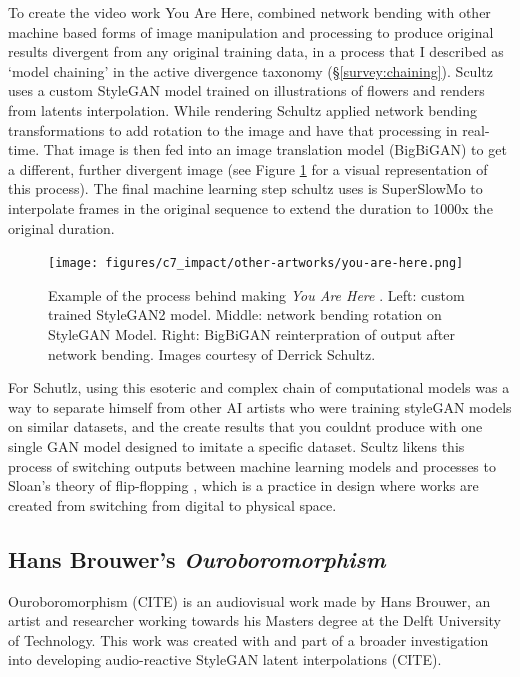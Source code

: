 To create the video work You Are Here, \citep{schutlz2020you} combined network bending with other machine based forms of image manipulation and processing to produce original results divergent from any original training data, in a process that I described as `model chaining' in the active divergence taxonomy (\S \ref{survey:chaining}).
Scultz uses a custom StyleGAN model trained on illustrations of flowers and renders from latents interpolation. 
While rendering Schultz applied network bending transformations to add rotation to the image and have that processing in real-time. 
That image is then fed into an image translation model (BigBiGAN) \citep{donahue2019large} to get a different, further divergent image (see Figure \ref{fig:c7:you-are-here} for a visual representation of this process). 
The final machine learning step schultz uses is SuperSlowMo \citep{jiang2018super} to interpolate frames in the original sequence to extend the duration to 1000x the original duration.

\begin{figure}[!htb]
    \centering
    \captionsetup{justification=centering}
    \texttt{[image: figures/c7\_impact/other-artworks/you-are-here.png]}
    \caption[Example of the process behind making \textit{You Are Here}.]{Example of the process behind making \textit{You Are Here} \citep{schutlz2020you}. Left: custom trained StyleGAN2 model. Middle: network bending rotation on StyleGAN Model. Right: BigBiGAN reinterpration of output after network bending. Images courtesy of Derrick Schultz.}
    \label{fig:c7:you-are-here}
\end{figure}

For Schutlz, using this esoteric and complex chain of computational models was a way to separate himself from other AI artists who were training styleGAN models on similar datasets, and the create results that you couldnt produce with one single GAN model designed to imitate a specific dataset. 
Scultz likens this process of switching outputs between machine learning models and processes to Sloan's theory of flip-flopping \citeyearpar{sloan2012flipflop}, which is a practice in design where works are created from switching from digital to physical space.

\subsection{Hans Brouwer's \textit{Ouroboromorphism}}

Ouroboromorphism (CITE) is an audiovisual work made by Hans Brouwer, an artist and researcher working towards his Masters degree at the Delft University of Technology. 
This work was created with and part of a broader investigation into developing audio-reactive StyleGAN latent interpolations (CITE). 

